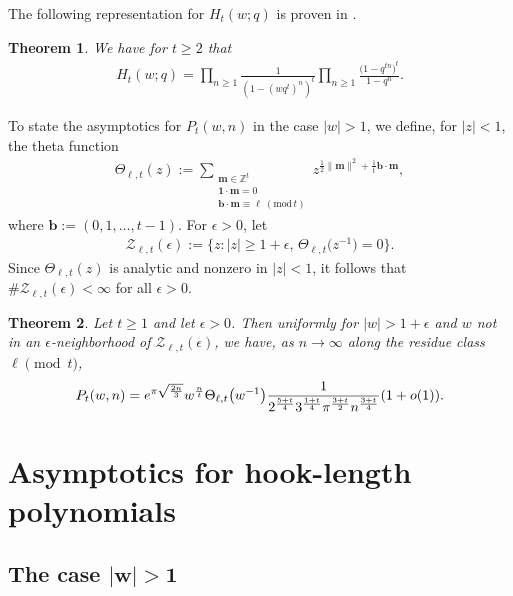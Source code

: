 \documentclass[11pt]{article}
\numberwithin{equation}{section}
\newtheorem{Theorem}{Theorem}[section]
\begin{document}
The following representation for $H_t(w;q)$ is proven in \cite[Corollary 5.1]{Han}.

\begin{Theorem}
 We have for $t \geq 2$ that
 \begin{align*}
 H_t(w;q) = \prod_{n \geq 1} \frac{1}{(1-(wq^t)^n)^t}\prod_{n \geq 1} \frac{\big(1-q^{tn}\big)^t}{1-q^n}.
 \end{align*}
\end{Theorem}


 To state the asymptotics for $P_t(w,n)$ in the case $|w|>1$, we define, for $|z|<1$, the theta function
\begin{align*}
 \Theta_{\ell,t}(z):=\sum_{\substack{\boldsymbol{m}\in \mathbb{Z}^t \\ \boldsymbol{1} \cdot \boldsymbol{m}=0 \\ \boldsymbol{b}\cdot \boldsymbol{m} \equiv \ell \ ({\text{mod}\, {t}}) }} z^{\frac{1}{2}\|\boldsymbol{m}\|^2+\frac{1}{t}\boldsymbol{b}\cdot \boldsymbol{m}},
\end{align*} where $\boldsymbol{b}:=(0,1,\dots,t-1)$. For $\epsilon>0$, let
\begin{align*}
\mathcal{Z}_{\ell,t}(\epsilon):=\bigl\{z : |z|\geq 1+\epsilon, \, \Theta_{\ell,t}\big(z^{-1}\big)=0\bigr\}.
\end{align*}
Since $\Theta_{\ell,t}(z)$ is analytic and nonzero in $|z|<1$, it follows that $\#\mathcal{Z}_{\ell,t}(\epsilon)<\infty$ for all $\epsilon>0$.

\begin{Theorem} \label{|w|>1 Asymptotics}
 Let $t
 \geq 1$ and let $\epsilon>0$. Then uniformly for $|w|>1+\epsilon$ and $w$ not in an $\epsilon$-neighborhood of $\mathcal{Z}_{\ell,t}(\epsilon)$, we have, as $n \to \infty$ along the residue class $\ell \pmod{t}$,
 \begin{align*}
P_t(w,n)= {\rm e}^{\pi \sqrt{\frac{2n}{3}}}w^{\frac{n}{t}} \Theta_{\ell,t}\big(w^{-1}\big)\frac{1}{2^{\frac{5+t}{4}}3^{\frac{1+t}{4}}\pi^{\frac{3+t}{2}}n^{\frac{3+t}{4}}}(1+o(1)).
 \end{align*}
\end{Theorem}


\section{Asymptotics for hook-length polynomials} \label{S: Asymptotics}

\subsection[The case |w|>1]{The case $\boldsymbol{|w|>1}$} %
\end{document}

